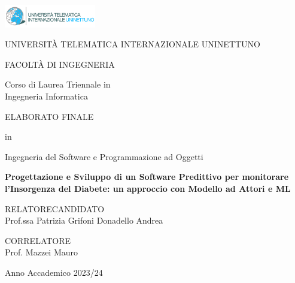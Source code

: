\begin{titlepage}

    \begin{center}
        
        \includegraphics[width=0.3\textwidth]{images/nettuno_logo}

        \vspace{1cm}

        \LARGE{UNIVERSITÀ TELEMATICA INTERNAZIONALE UNINETTUNO} 

        \vspace{2cm}

        \large{FACOLTÀ DI INGEGNERIA} \\

        \vspace{0.2cm}

        Corso di Laurea Triennale in \\
        Ingegneria Informatica \\
        
        \vspace{1cm}

        \normalsize{ELABORATO FINALE} \\

        \vspace{0.2cm}

        in \\

        \vspace{0.2cm}

        \large{Ingegneria del Software e Programmazione ad Oggetti}

        \vspace{1.5cm}

        \large\textbf{Progettazione e Sviluppo di un Software Predittivo per monitorare l'Insorgenza del Diabete: un approccio con Modello ad Attori e ML}

        \vspace{1.5cm}

        \raggedright{
            RELATORE\hfill{CANDIDATO} \\
            Prof.ssa Patrizia Grifoni \hfill{Donadello Andrea}
            
            \vspace{1cm}

            CORRELATORE \\
            Prof. Mazzei Mauro
        }
        
        \centering
        
        \vfill
     
        \small{Anno Accademico 2023/24}
                          
    \end{center}

 \end{titlepage}